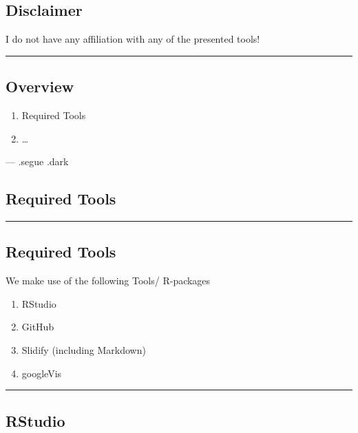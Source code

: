 \subsection{Disclaimer}\label{disclaimer}

I do not have any affiliation with any of the presented tools!

\begin{center}\rule{0.5\linewidth}{\linethickness}\end{center}

\subsection{Overview}\label{overview}

\begin{enumerate}
\def\labelenumi{\arabic{enumi}.}
\item
  Required Tools
\item
  \ldots{}
\end{enumerate}

--- .segue .dark

\subsection{Required Tools}\label{required-tools}

\begin{center}\rule{0.5\linewidth}{\linethickness}\end{center}

\subsection{Required Tools}\label{required-tools-1}

We make use of the following Tools/ R-packages

\begin{enumerate}
\def\labelenumi{\arabic{enumi}.}
\item
  RStudio
\item
  GitHub
\item
  Slidify (including Markdown)
\item
  googleVis
\end{enumerate}

\begin{center}\rule{0.5\linewidth}{\linethickness}\end{center}

\subsection{RStudio}\label{rstudio}

